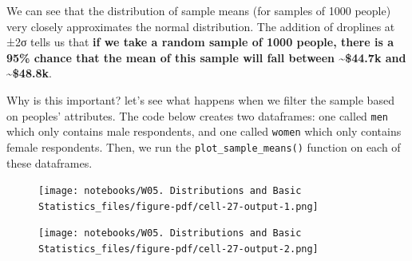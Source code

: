 \documentclass[
  letterpaper,
  DIV=11,
  numbers=noendperiod]{scrreprt}
\newenvironment{Shaded}{\begin{snugshade}}{\end{snugshade}}
\newcommand{\CommentTok}[1]{\textcolor[rgb]{0.37,0.37,0.37}{#1}}
\newcommand{\DecValTok}[1]{\textcolor[rgb]{0.68,0.00,0.00}{#1}}
\newcommand{\NormalTok}[1]{\textcolor[rgb]{0.00,0.23,0.31}{#1}}
\newcommand{\OperatorTok}[1]{\textcolor[rgb]{0.37,0.37,0.37}{#1}}
\newcommand{\StringTok}[1]{\textcolor[rgb]{0.13,0.47,0.30}{#1}}
\begin{document}
We can see that the distribution of sample means (for samples of 1000
people) very closely approximates the normal distribution. The addition
of droplines at ±2σ tells us that \textbf{if we take a random sample of
1000 people, there is a 95\% chance that the mean of this sample will
fall between \textasciitilde\$44.7k and \textasciitilde\$48.8k}.

Why is this important? let's see what happens when we filter the sample
based on peoples' attributes. The code below creates two dataframes: one
called \texttt{men} which only contains male respondents, and one called
\texttt{women} which only contains female respondents. Then, we run the
\texttt{plot\_sample\_means()} function on each of these dataframes.

\begin{Shaded}
\end{Shaded}

\begin{figure}[H]

{\centering \texttt{[image: notebooks/W05. Distributions and Basic Statistics\_files/figure-pdf/cell-27-output-1.png]}

}

\end{figure}

\begin{figure}[H]

{\centering \texttt{[image: notebooks/W05. Distributions and Basic Statistics\_files/figure-pdf/cell-27-output-2.png]}

}

\end{figure}
\end{document}
